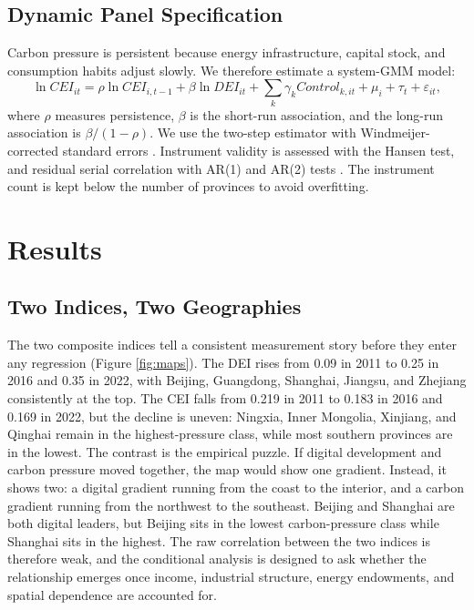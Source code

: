 \documentclass[economies,article,submit,moreauthors]{Definitions/mdpi}
\begin{document}
\subsection{Dynamic Panel Specification}

Carbon pressure is persistent because energy infrastructure, capital stock, and consumption habits adjust slowly. We therefore estimate a system-GMM model:
\begin{equation}
\ln CEI_{it}=\rho\ln CEI_{i,t-1}+\beta\ln DEI_{it}
+\sum_k\gamma_k Control_{k,it}+\mu_i+\tau_t+\varepsilon_{it},
\label{eq:gmm}
\end{equation}
where $\rho$ measures persistence, $\beta$ is the short-run association, and the long-run association is $\beta/(1-\rho)$. We use the two-step estimator with Windmeijer-corrected standard errors \citep{windmeijer2005}. Instrument validity is assessed with the Hansen test, and residual serial correlation with AR(1) and AR(2) tests \citep{arellano1991,blundell1998,roodman2009}. The instrument count is kept below the number of provinces to avoid overfitting.

\section{Results}

\subsection{Two Indices, Two Geographies}

The two composite indices tell a consistent measurement story before they enter any regression (Figure \ref{fig:maps}). The DEI rises from 0.09 in 2011 to 0.25 in 2016 and 0.35 in 2022, with Beijing, Guangdong, Shanghai, Jiangsu, and Zhejiang consistently at the top. The CEI falls from 0.219 in 2011 to 0.183 in 2016 and 0.169 in 2022, but the decline is uneven: Ningxia, Inner Mongolia, Xinjiang, and Qinghai remain in the highest-pressure class, while most southern provinces are in the lowest. The contrast is the empirical puzzle. If digital development and carbon pressure moved together, the map would show one gradient. Instead, it shows two: a digital gradient running from the coast to the interior, and a carbon gradient running from the northwest to the southeast. Beijing and Shanghai are both digital leaders, but Beijing sits in the lowest carbon-pressure class while Shanghai sits in the highest. The raw correlation between the two indices is therefore weak, and the conditional analysis is designed to ask whether the relationship emerges once income, industrial structure, energy endowments, and spatial dependence are accounted for.
\end{document}
